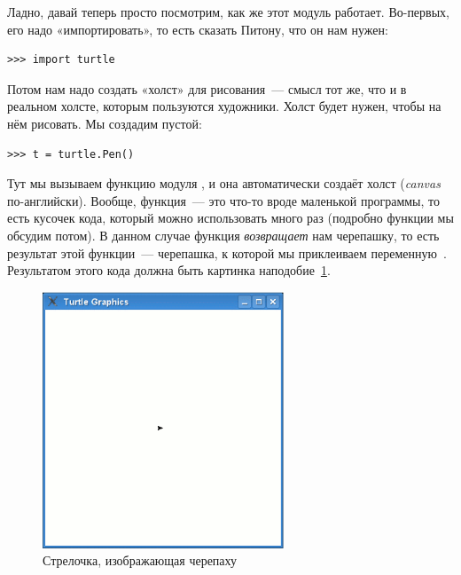 Ладно, давай теперь просто посмотрим, как же этот модуль работает. Во-первых, его надо «импортировать», то есть сказать Питону, что он нам нужен:

\begin{listing}
\begin{verbatim}
>>> import turtle
\end{verbatim}
\end{listing}

Потом нам надо создать «холст» для рисования — смысл тот же, что и в реальном холсте, которым пользуются художники. Холст будет нужен, чтобы на нём рисовать. Мы создадим пустой:

\begin{listing}
\begin{verbatim}
>>> t = turtle.Pen()
\end{verbatim}
\end{listing}

Тут мы вызываем функцию  модуля , и она автоматически создаёт холст (\emph{canvas} по-английски). Вообще, функция — это что-то вроде маленькой программы, то есть кусочек кода, который можно использовать много раз (подробно функции мы обсудим потом). В данном случае функция  \emph{возвращает} нам черепашку, то есть результат этой функции — черепашка, к которой мы приклеиваем переменную . Результатом этого кода должна быть картинка наподобие \ref{fig10}.

\begin{figure}
\begin{center}
\includegraphics[width=72mm]{../en/figure10.eps}
\end{center}
\caption{Стрелочка, изображающая черепаху}\label{fig10}
\end{figure}

